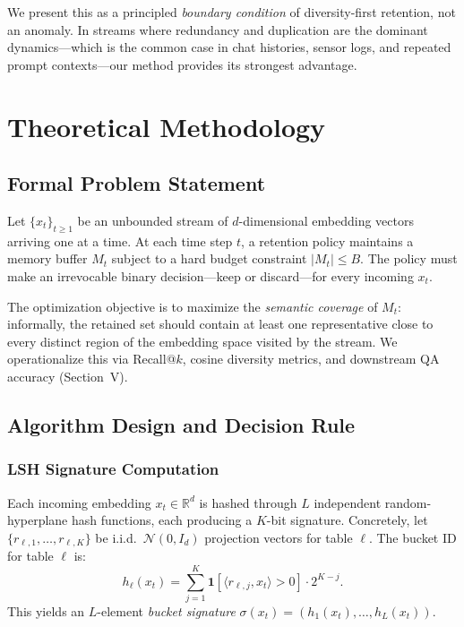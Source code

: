 \documentclass[conference]{IEEEtran}
\begin{document}
We present this as a principled \emph{boundary condition} of
diversity-first retention, not an anomaly. In streams where redundancy
and duplication are the dominant dynamics---which is the common case in
chat histories, sensor logs, and repeated prompt contexts---our method
provides its strongest advantage.

\section{Theoretical Methodology}

\subsection{Formal Problem Statement}
Let $\{x_t\}_{t \ge 1}$ be an unbounded stream of $d$-dimensional
embedding vectors arriving one at a time. At each time step $t$, a
retention policy maintains a memory buffer $M_t$ subject to a hard
budget constraint $|M_t| \le B$. The policy must make an irrevocable
binary decision---keep or discard---for every incoming $x_t$.

The optimization objective is to maximize the \emph{semantic coverage}
of $M_t$: informally, the retained set should contain at least one
representative close to every distinct region of the embedding space
visited by the stream. We operationalize this via Recall@$k$, cosine diversity metrics,
and downstream QA accuracy (Section~V).

\subsection{Algorithm Design and Decision Rule}
\subsubsection{LSH Signature Computation}
Each incoming embedding $x_t \in \mathbb{R}^d$ is hashed through $L$
independent random-hyperplane hash functions, each producing a $K$-bit
signature. Concretely, let $\{r_{\ell,1},\ldots,r_{\ell,K}\}$ be
i.i.d.\ $\mathcal{N}(0,I_d)$ projection vectors for table $\ell$. The
bucket ID for table $\ell$ is:
\begin{equation}
h_\ell(x_t) = \sum_{j=1}^{K} \mathbf{1}[\langle r_{\ell,j}, x_t \rangle > 0] \cdot 2^{K-j}.
\label{eq:hash}
\end{equation}
This yields an $L$-element \emph{bucket signature}
$\sigma(x_t) = (h_1(x_t),\ldots,h_L(x_t))$.
\end{document}
